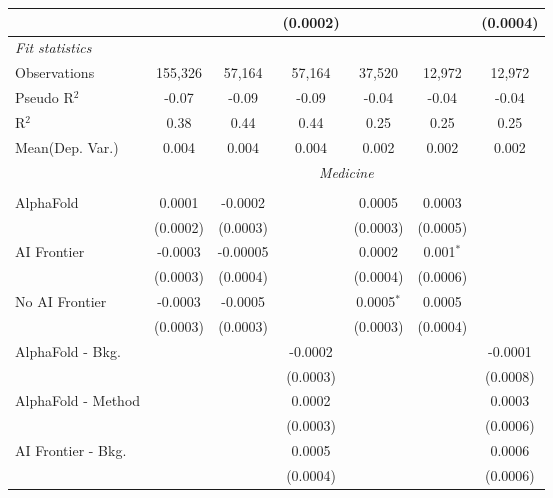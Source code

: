 \begin{tabular}{lcccccc}
                           &                &          & (0.0002)       &               &          & (0.0004)\\   
   \midrule
   \emph{Fit statistics}\\
   Observations            & 155,326        & 57,164   & 57,164         & 37,520        & 12,972   & 12,972\\  
   Pseudo R$^2$            & -0.07          & -0.09    & -0.09          & -0.04         & -0.04    & -0.04\\  
   R$^2$                   & 0.38           & 0.44     & 0.44           & 0.25          & 0.25     & 0.25\\  
   
Mean(Dep. Var.) & 0.004 & 0.004 & 0.004 & 0.002 & 0.002 & 0.002 \\
 & \multicolumn{6}{c}{\textit{Medicine}} \\ \\
   AlphaFold               & 0.0001   & -0.0002  &          & 0.0005       & 0.0003      &   \\   
                           & (0.0002) & (0.0003) &          & (0.0003)     & (0.0005)    &   \\   
   AI Frontier             & -0.0003  & -0.00005 &          & 0.0002       & 0.001$^{*}$ &   \\   
                           & (0.0003) & (0.0004) &          & (0.0004)     & (0.0006)    &   \\   
   No AI Frontier          & -0.0003  & -0.0005  &          & 0.0005$^{*}$ & 0.0005      &   \\   
                           & (0.0003) & (0.0003) &          & (0.0003)     & (0.0004)    &   \\   
   AlphaFold - Bkg.        &          &          & -0.0002  &              &             & -0.0001\\   
                           &          &          & (0.0003) &              &             & (0.0008)\\   
   AlphaFold - Method      &          &          & 0.0002   &              &             & 0.0003\\   
                           &          &          & (0.0003) &              &             & (0.0006)\\   
   AI Frontier - Bkg.      &          &          & 0.0005   &              &             & 0.0006\\   
                           &          &          & (0.0004) &              &             & (0.0006)\\   

\end{tabular}
